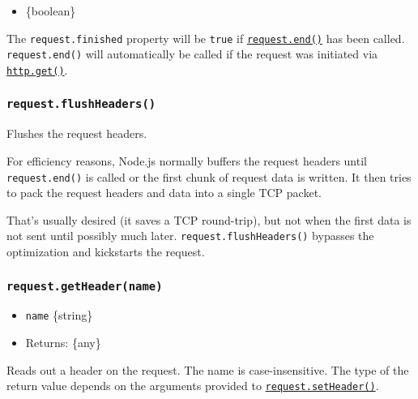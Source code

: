 \begin{itemize}
\tightlist
\item
  \{boolean\}
\end{itemize}

The \texttt{request.finished} property will be \texttt{true} if
\hyperref[requestenddata-encoding-callback]{\texttt{request.end()}} has
been called. \texttt{request.end()} will automatically be called if the
request was initiated via
\hyperref[httpgetoptions-callback]{\texttt{http.get()}}.

\subsubsection{\texorpdfstring{\texttt{request.flushHeaders()}}{request.flushHeaders()}}\label{request.flushheaders}

Flushes the request headers.

For efficiency reasons, Node.js normally buffers the request headers
until \texttt{request.end()} is called or the first chunk of request
data is written. It then tries to pack the request headers and data into
a single TCP packet.

That's usually desired (it saves a TCP round-trip), but not when the
first data is not sent until possibly much later.
\texttt{request.flushHeaders()} bypasses the optimization and kickstarts
the request.

\subsubsection{\texorpdfstring{\texttt{request.getHeader(name)}}{request.getHeader(name)}}\label{request.getheadername}

\begin{itemize}
\tightlist
\item
  \texttt{name} \{string\}
\item
  Returns: \{any\}
\end{itemize}

Reads out a header on the request. The name is case-insensitive. The
type of the return value depends on the arguments provided to
\hyperref[requestsetheadername-value]{\texttt{request.setHeader()}}.

